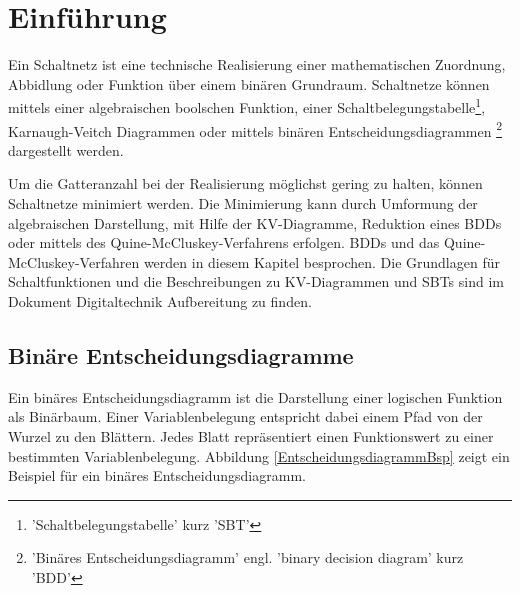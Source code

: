 \chapter{Einführung}
Ein Schaltnetz ist eine technische Realisierung einer mathematischen Zuordnung, Abbidlung oder Funktion über einem binären Grundraum. Schaltnetze können mittels einer algebraischen boolschen Funktion, einer Schaltbelegungstabelle\footnote{'Schaltbelegungstabelle' kurz 'SBT'}, Karnaugh-Veitch Diagrammen oder mittels binären Entscheidungsdiagrammen \footnote{'Binäres Entscheidungsdiagramm' engl. 'binary decision diagram' kurz 'BDD'} dargestellt werden.

Um die Gatteranzahl bei der Realisierung möglichst gering zu halten, können Schaltnetze minimiert werden. Die Minimierung kann durch Umformung der algebraischen Darstellung, mit Hilfe der KV-Diagramme, Reduktion eines BDDs oder mittels des Quine-McCluskey-Verfahrens erfolgen. BDDs und das Quine-McCluskey-Verfahren werden in diesem Kapitel besprochen. Die Grundlagen für Schaltfunktionen und die Beschreibungen zu KV-Diagrammen und SBTs sind im Dokument Digitaltechnik Aufbereitung zu finden. 

\section{Binäre Entscheidungsdiagramme}
Ein binäres Entscheidungsdiagramm ist die Darstellung einer logischen Funktion als Binärbaum. Einer Variablenbelegung entspricht dabei einem Pfad von der Wurzel zu den Blättern. Jedes Blatt repräsentiert einen Funktionswert zu einer bestimmten Variablenbelegung. Abbildung \ref{EntscheidungsdiagrammBsp} zeigt ein Beispiel für ein binäres Entscheidungsdiagramm.


